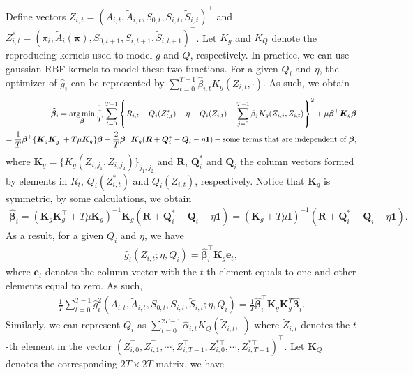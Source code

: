 \documentclass{article}
\DeclareMathOperator*{\argmin}{arg\,min}
\begin{document}
Define vectors $Z_{i,t}=(A_{i,t},\widetilde{A}_{i,t},S_{0,t},S_{i,t},\widetilde{S}_{i,t})^\top$ and $Z_{i,t}^*=(\pi_i,\widetilde{A}_i(\bm{\pi}),S_{0,t+1},S_{i,t+1},\widetilde{S}_{i,t+1})^\top$. Let $K_g$ and $K_Q$ denote the reproducing kernels used to model $g$ and $Q$, respectively. In practice, we can use gaussian RBF kernels to model these two functions. For a given $Q_i$ and $\eta$, the optimizer of $\widehat{g}_i$ can be represented by $\sum_{t=0}^{T-1} \widehat{\beta}_{i,t} K_g(Z_{i,t},\cdot)$. As such, we obtain
\begin{eqnarray*}
	\widehat{\bm{\beta}}_i=\argmin_{\bm{\beta}} \frac{1}{T}\sum_{t=0}^{T-1} \left\{R_{i,t}+Q_i(Z_{i,t}^*)-\eta-Q_i(Z_{i,t})-\sum_{j=0}^{T-1} \beta_{j} K_g(Z_{i,j},Z_{i,t}) \right\}^2+\mu \bm{\beta}^\top \bm{K}_g \bm{\beta}\\
	=\frac{1}{T} \bm{\beta}^\top \{\bm{K}_g\bm{K}_g^\top+T\mu \bm{K}_g\} \bm{\beta}-\frac{2}{T}\bm{\beta}^\top \bm{K}_g (\bm{R}+\bm{Q}_i^{*}-\bm{Q}_i-\eta \bm{1})
	+\hbox{some~terms~that~are~independent~of~}\bm{\beta},
\end{eqnarray*}
where $\bm{K}_g=\{K_g(Z_{i,j_1},Z_{i,j_2})\}_{j_1,j_2}$ and $\bm{R}$, $\bm{Q}_i^{*}$ and $\bm{Q}_i$ the column vectors formed by elements in $R_t$, $Q_i(Z_{i,t}^*)$ and $Q_i(Z_{i,t})$, respectively. Notice that $\bm{K}_g$ is symmetric, by some calculations, we obtain
\begin{eqnarray*}
	\widehat{\bm{\beta}}_i=(\bm{K}_g\bm{K}_g^\top+T\mu \bm{K}_g)^{-1} \bm{K}_g (\bm{R}+\bm{Q}_i^{*}-\bm{Q}_i-\eta \bm{1})
	=(\bm{K}_g+T\mu\bm{I})^{-1} (\bm{R}+\bm{Q}_i^{*}-\bm{Q}_i-\eta \bm{1}).
\end{eqnarray*}
As a result, for a given $Q_i$ and $\eta$, we have
\begin{eqnarray*}
	\widehat{g}_i(Z_{i,t};\eta,Q_i)=\widehat{\bm{\beta}}_i^\top \bm{K}_g \bm{e}_t,
\end{eqnarray*}
where $\bm{e}_t$ denotes the column vector with the $t$-th element equals to one and other elements equal to zero. As such,
\begin{eqnarray*}
	\frac{1}{T}\sum_{t=0}^{T-1} \widehat{g}_{i}^2(A_{i,t},\widetilde{A}_{i,t},S_{0,t},S_{i,t},\widetilde{S}_{i,t};\eta,Q_i)=\frac{1}{T}\widehat{\bm{\beta}}_i^\top \bm{K}_g \bm{K}_g^T \widehat{\bm{\beta}}_i.
\end{eqnarray*}
Similarly, we can represent $Q_i$ as $\sum_{t=0}^{2T-1} \widehat{\alpha}_{i,t} K_Q(\widetilde{Z}_{i,t},\cdot)$ where $\widetilde{Z}_{i,t}$ denotes the $t$-th element in the vector $(Z_{i,0}^\top,Z_{i,1}^\top,\cdots,Z_{i,T-1}^\top,Z_{i,0}^{*\top},\cdots,Z_{i,T-1}^{*\top})^\top$. Let $\bm{K}_Q$ denotes the corresponding $2T\times 2T$ matrix, we have
\end{document}
